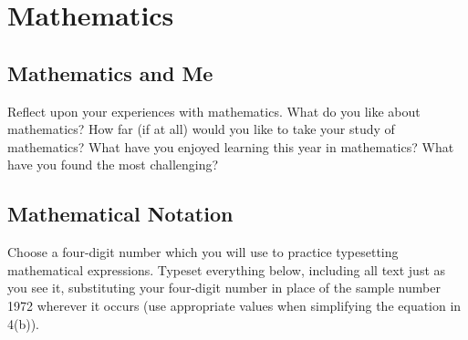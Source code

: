 \documentclass[12pt]{article}
\begin{document}
\section{Mathematics}

\subsection{Mathematics and Me}
Reflect upon your experiences with mathematics. What do you like about mathematics? How far (if at all) would you like to take your study of mathematics? What have you enjoyed learning this year in mathematics? What have you found the most challenging?

\subsection{Mathematical Notation}
Choose a four-digit number which you will use to practice typesetting mathematical expressions. Typeset everything below, including all text just as you see it, substituting your four-digit number in place of the sample number 1972 wherever it occurs (use appropriate values when simplifying the equation in 4(b)).
\end{document}
